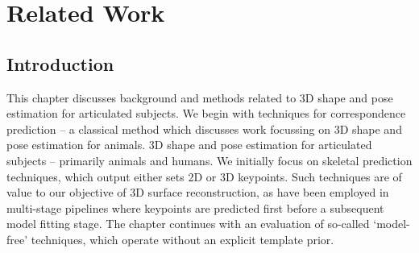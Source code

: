 
\chapter{Related Work}

\ifpdf
    \graphicspath{{Chapter3/Figs/Raster/}{Chapter3/Figs/PDF/}{Chapter3/Figs/}}
\else
    \graphicspath{{Chapter3/Figs/Vector/}{Chapter3/Figs/}}
\fi

\section{Introduction}

This chapter discusses background and methods related to 3D shape and pose estimation for articulated subjects. We begin with techniques for correspondence prediction -- a classical method which discusses work focussing on 3D shape and pose estimation for animals. 3D shape and pose estimation for articulated subjects -- primarily animals and humans. We initially focus on skeletal prediction techniques, which output either sets 2D or 3D keypoints. Such techniques are of value to our objective of 3D surface reconstruction, as have been employed in multi-stage pipelines where keypoints are predicted first before a subsequent model fitting stage. The chapter continues with an evaluation of so-called `model-free' techniques, which operate without an explicit template prior.


% 




